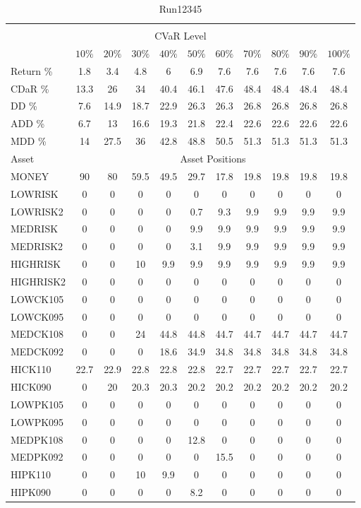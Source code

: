 \begin{table}[h!t]
\caption{Run12345}
\centering
\begin{tabular}[t]{ l c c c c c c c c c c }
\hline\hline \\
\multicolumn{11}{c}{CVaR Level} \\
 & $10\%$ & $20\%$ & $30\%$ & $40\%$ & $50\%$ & $60\%$ & $70\%$ & $80\%$ & $90\%$ & $100\%$ \\[0.5ex]
Return \% &1.8 &3.4 &4.8 &6 &6.9 &7.6 &7.6 &7.6 &7.6 &7.6\\
CDaR \% &13.3 &26 &34 &40.4 &46.1 &47.6 &48.4 &48.4 &48.4 &48.4\\
DD \% &7.6 &14.9 &18.7 &22.9 &26.3 &26.3 &26.8 &26.8 &26.8 &26.8\\
ADD \% &6.7 &13 &16.6 &19.3 &21.8 &22.4 &22.6 &22.6 &22.6 &22.6\\
MDD \% &14 &27.5 &36 &42.8 &48.8 &50.5 &51.3 &51.3 &51.3 &51.3\\[0.5ex]
Asset & \multicolumn{10}{c}{Asset Positions} \\[1ex]
MONEY & 90 & 80 & 59.5 & 49.5 & 29.7 & 17.8 & 19.8 & 19.8 & 19.8 & 19.8\\
LOWRISK & 0 & 0 & 0 & 0 & 0 & 0 & 0 & 0 & 0 & 0\\
LOWRISK2 & 0 & 0 & 0 & 0 & 0.7 & 9.3 & 9.9 & 9.9 & 9.9 & 9.9\\
MEDRISK & 0 & 0 & 0 & 0 & 9.9 & 9.9 & 9.9 & 9.9 & 9.9 & 9.9\\
MEDRISK2 & 0 & 0 & 0 & 0 & 3.1 & 9.9 & 9.9 & 9.9 & 9.9 & 9.9\\
HIGHRISK & 0 & 0 & 10 & 9.9 & 9.9 & 9.9 & 9.9 & 9.9 & 9.9 & 9.9\\
HIGHRISK2 & 0 & 0 & 0 & 0 & 0 & 0 & 0 & 0 & 0 & 0\\
LOWCK105 & 0 & 0 & 0 & 0 & 0 & 0 & 0 & 0 & 0 & 0\\
LOWCK095 & 0 & 0 & 0 & 0 & 0 & 0 & 0 & 0 & 0 & 0\\
MEDCK108 & 0 & 0 & 24 & 44.8 & 44.8 & 44.7 & 44.7 & 44.7 & 44.7 & 44.7\\
MEDCK092 & 0 & 0 & 0 & 18.6 & 34.9 & 34.8 & 34.8 & 34.8 & 34.8 & 34.8\\
HICK110 & 22.7 & 22.9 & 22.8 & 22.8 & 22.8 & 22.7 & 22.7 & 22.7 & 22.7 & 22.7\\
HICK090 & 0 & 20 & 20.3 & 20.3 & 20.2 & 20.2 & 20.2 & 20.2 & 20.2 & 20.2\\
LOWPK105 & 0 & 0 & 0 & 0 & 0 & 0 & 0 & 0 & 0 & 0\\
LOWPK095 & 0 & 0 & 0 & 0 & 0 & 0 & 0 & 0 & 0 & 0\\
MEDPK108 & 0 & 0 & 0 & 0 & 12.8 & 0 & 0 & 0 & 0 & 0\\
MEDPK092 & 0 & 0 & 0 & 0 & 0 & 15.5 & 0 & 0 & 0 & 0\\
HIPK110 & 0 & 0 & 10 & 9.9 & 0 & 0 & 0 & 0 & 0 & 0\\
HIPK090 & 0 & 0 & 0 & 0 & 8.2 & 0 & 0 & 0 & 0 & 0\\
[1ex] \hline
\end{tabular}
\end{table} 